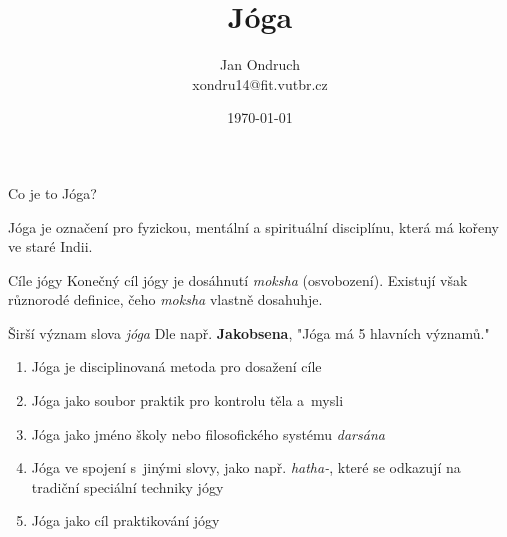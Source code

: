 \documentclass[pdf,slideColor,fyma]{beamer}
\title{Jóga}
\author{Jan Ondruch \\ {\footnotesize xondru14@fit.vutbr.cz}}
\institute{Fakulta informačních technologií \\ Vysoké učení technické v~Brně}
\date{\today}
\begin{document}
\begin{frame}
	\titlepage
\end{frame}
\begin{frame}{Co je to Jóga?}
	\begin{center}
    Jóga je označení pro fyzickou, mentální a spirituální disciplínu, která má kořeny ve staré Indii.
  	\end{center}  
\end{frame}
\begin{frame}{Cíle jógy}
	Konečný cíl jógy je dosáhnutí {\itshape moksha} (osvobození). Existují však různorodé definice, čeho {\itshape moksha} vlastně dosahuhje.
	\medskip
	\begin{figure}[H]
  		\centering
	\end{figure}	  
\end{frame}
\begin{frame}{Širší význam slova  {\itshape jóga}}
	Dle např. \textbf{Jakobsena}, "Jóga má 5 hlavních významů."
	\medskip
	\begin{enumerate}
		\item Jóga je disciplinovaná metoda pro dosažení cíle
		\item Jóga jako soubor praktik pro kontrolu těla a~mysli
		\item Jóga jako jméno školy nebo filosofického systému {\itshape darsána}
		\item Jóga ve spojení s~jinými slovy, jako např. {\itshape hatha-}, které se odkazují na tradiční speciální techniky jógy
		\item Jóga jako cíl praktikování jógy
	\end{enumerate}
\end{frame}
\end{document}
